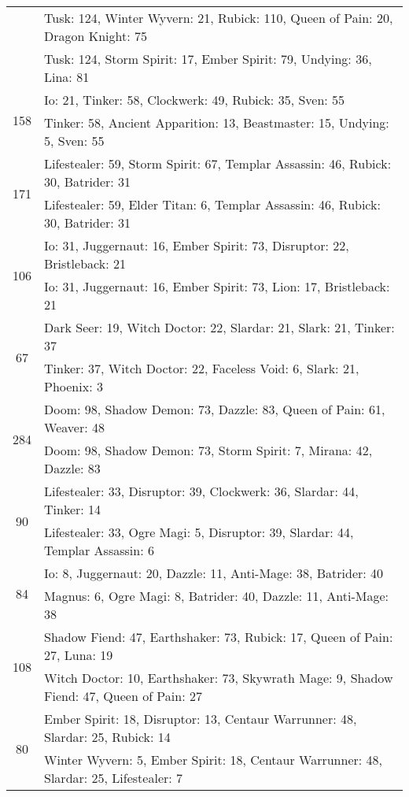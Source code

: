 \documentclass[result.tex]{subfiles}
\begin{document}
\begin{table}[H]
\begin{tabular}{ | c | p{12.5cm} | }
& Tusk: 124, Winter Wyvern: 21, Rubick: 110, Queen of Pain: 20, Dragon Knight: 75 \\
& Tusk: 124, Storm Spirit: 17, Ember Spirit: 79, Undying: 36, Lina: 81 \\
\hline
\multirow{2}{*}{158}
& Io: 21, Tinker: 58, Clockwerk: 49, Rubick: 35, Sven: 55 \\
& Tinker: 58, Ancient Apparition: 13, Beastmaster: 15, Undying: 5, Sven: 55 \\
\hline
\multirow{2}{*}{171}
& Lifestealer: 59, Storm Spirit: 67, Templar Assassin: 46, Rubick: 30, Batrider: 31 \\
& Lifestealer: 59, Elder Titan: 6, Templar Assassin: 46, Rubick: 30, Batrider: 31 \\
\hline
\multirow{2}{*}{106}
& Io: 31, Juggernaut: 16, Ember Spirit: 73, Disruptor: 22, Bristleback: 21 \\
& Io: 31, Juggernaut: 16, Ember Spirit: 73, Lion: 17, Bristleback: 21 \\
\hline
\multirow{2}{*}{67}
& Dark Seer: 19, Witch Doctor: 22, Slardar: 21, Slark: 21, Tinker: 37 \\
& Tinker: 37, Witch Doctor: 22, Faceless Void: 6, Slark: 21, Phoenix: 3 \\
\hline
\multirow{2}{*}{284}
& Doom: 98, Shadow Demon: 73, Dazzle: 83, Queen of Pain: 61, Weaver: 48 \\
& Doom: 98, Shadow Demon: 73, Storm Spirit: 7, Mirana: 42, Dazzle: 83 \\
\hline
\multirow{2}{*}{90}
& Lifestealer: 33, Disruptor: 39, Clockwerk: 36, Slardar: 44, Tinker: 14 \\
& Lifestealer: 33, Ogre Magi: 5, Disruptor: 39, Slardar: 44, Templar Assassin: 6 \\
\hline
\multirow{2}{*}{84}
& Io: 8, Juggernaut: 20, Dazzle: 11, Anti-Mage: 38, Batrider: 40 \\
& Magnus: 6, Ogre Magi: 8, Batrider: 40, Dazzle: 11, Anti-Mage: 38 \\
\hline
\multirow{2}{*}{108}
& Shadow Fiend: 47, Earthshaker: 73, Rubick: 17, Queen of Pain: 27, Luna: 19 \\
& Witch Doctor: 10, Earthshaker: 73, Skywrath Mage: 9, Shadow Fiend: 47, Queen of Pain: 27 \\
\hline
\multirow{2}{*}{80}
& Ember Spirit: 18, Disruptor: 13, Centaur Warrunner: 48, Slardar: 25, Rubick: 14 \\
& Winter Wyvern: 5, Ember Spirit: 18, Centaur Warrunner: 48, Slardar: 25, Lifestealer: 7 \\

\end{tabular}
\end{table}
\end{document}
